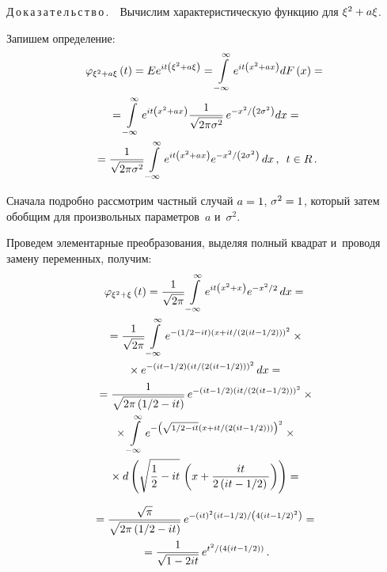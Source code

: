 \begin{multicols}{2}
\noindent
Д\,о\,к\,а\,з\,а\,т\,е\,л\,ь\,с\,т\,в\,о\,.\ \
 Вычислим характеристическую функцию для $\xi^{2} \hm+a \xi$.

Запишем определение:
\begin{multline*}
    \varphi_{\xi^{2} + a\xi} \left(t \right) = 
    Ee^{it\left( \xi^{2} + a\xi \right) } = 
      \int\limits_{-\infty}^{\infty}e^{it\left( x^{2} + ax \right) } dF\left( x\right) ={}\\
{}    = \int\limits_{-\infty}^{\infty}
e^{it\left( x^{2} + ax \right) } 
\displaystyle\frac{\displaystyle 1\mathstrut}{\displaystyle \sqrt{2\pi\sigma^2}\mathstrut}\,
e^{-{x^{2}}/\left({2\sigma^{2}}\right)} dx ={}\\
{}=\displaystyle\frac{\displaystyle 1\mathstrut}{\displaystyle \sqrt{2\pi\sigma^2}\mathstrut}
\int\limits_{-\infty}^{\infty}e^{it\left( x^{2} + 
ax \right) }e^{-{x^{2}}/\left({2\sigma^{2}}\right)} \,dx\,,\enskip
t\in R\,.
\end{multline*}
    
Сначала подробно рассмотрим частный случай $a\hm=1$, $\sigma^{2}\hm = 1$, 
который затем обобщим для произвольных параметров~$a$ и~$\sigma^{2}$.

Проведем элементарные преобразования, выделяя полный квадрат и~проводя 
замену переменных, получим:
\begin{multline*}
\varphi_{\xi^{2} + \xi} \left(t \right) = 
\displaystyle\frac{\displaystyle 1\mathstrut}{\displaystyle \sqrt{2\pi}\mathstrut}\int\limits_{-\infty}^{\infty}e^{it\left( x^{2} + x \right) }
e^{-{x^{2}}/{2}}\, dx  ={}\\
{}= 
\displaystyle\frac{\displaystyle 1\mathstrut}{\displaystyle \sqrt{2\pi}\mathstrut}\int\limits_{-\infty}^{\infty}
e^{-\left( {1}/{2}-it\right) \left( x + {it}/\left({2\left( it - {1}/{2}\right) }\right) 
\right)^{2} }\times{}\\
{}\times e^{-\left( it - {1}/{2}\right) \left( 
{it}/({2\left(it - {1}/{2}\right) })\right)^{2} } \, dx ={}\\
{}= 
\displaystyle\frac{\displaystyle 1\mathstrut}{\displaystyle \sqrt{2\pi\left( {1}/{2}-it\right) }\mathstrut}\,
e^{-\left( it - {1}/{2}\right) \left( 
{it}/({2\left(it - {1}/{2}\right) })\right)^{2} }\times{}\\
{}\times 
\int\limits_{-\infty}^{\infty}
e^{-\left( \sqrt{{1}/{2}-it} \left( x + 
{it}/({2\left( it - {1}/{2}\right) }) \right)\right)^{2} }\times{}\\
{}\times d
\left( \sqrt{\displaystyle\frac{\displaystyle 1\mathstrut}{\displaystyle 2\mathstrut}-it}\,
 \left( x + \displaystyle\frac{\displaystyle it\mathstrut}{\displaystyle 2\left( it - {1}/{2}\right) \mathstrut} \right)\right) ={}
\end{multline*}

\noindent
\begin{multline*}
{}= 
\displaystyle\frac{\displaystyle \sqrt{\pi}\mathstrut}{\displaystyle \sqrt{2\pi\left( {1}/{2}-it\right) }\mathstrut}\,
e^{-{\left( it\right)^{2}\left( it - {1}/{2}\right) }/
\left({4\left(it - {1}/{2}\right)^2 }\right)} = {}\\
{}=
\displaystyle\frac{\displaystyle 1\mathstrut}{\displaystyle \sqrt{1-2it}\mathstrut}\,e^{{t^{2}}/({4\left(it - {1}/{2}\right) })}\,.
\end{multline*}
    

\end{multicols}
